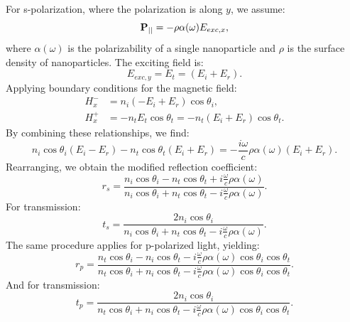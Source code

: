 \documentclass{article}
\begin{document}
	For s-polarization, where the polarization is along $y$, we assume:
	\begin{equation}
		\vb{P}_{||} = -\rho \alpha(\omega) E_{exc, x},
	\end{equation}
	where $\alpha(\omega)$ is the polarizability of a single nanoparticle and $\rho$ is the surface density of nanoparticles. The exciting field is:
	\begin{equation}
		E_{exc, y} = E_t = (E_i + E_r).
	\end{equation}
	Applying boundary conditions for the magnetic field:
	\begin{align}
		H_{x}^{-} &= n_i (-E_i + E_r) \cos \theta_i, \\
		H_{x}^{+} &= -n_t E_t \cos \theta_t = -n_t (E_i + E_r) \cos \theta_t.
	\end{align}
	By combining these relationships, we find:
	\begin{equation}
		n_i \cos \theta_i (E_i - E_r) - n_t \cos \theta_t (E_i + E_r) = -\frac{i \omega}{c} \rho \alpha(\omega) (E_i + E_r).
	\end{equation}
	Rearranging, we obtain the modified reflection coefficient:
	\begin{equation}
		r_s = \frac{n_i \cos \theta_i - n_t \cos \theta_t + i \frac{\omega}{c} \rho \alpha(\omega)}{n_i \cos \theta_i + n_t \cos \theta_t - i \frac{\omega}{c} \rho \alpha(\omega)}.
	\end{equation}
	For transmission:
	\begin{equation}
		t_s = \frac{2 n_i \cos \theta_i}{n_i \cos \theta_i + n_t \cos \theta_t - i \frac{\omega}{c} \rho \alpha(\omega)}.
	\end{equation}
	The same procedure applies for p-polarized light, yielding:
	\begin{equation}
		r_p = \frac{n_t \cos \theta_i - n_i \cos \theta_t - i \frac{\omega}{c} \rho \alpha(\omega) \cos \theta_i \cos \theta_t}{n_t \cos \theta_i + n_i \cos \theta_t - i \frac{\omega}{c} \rho \alpha(\omega) \cos \theta_i \cos \theta_t}.
	\end{equation}
	And for transmission:
	\begin{equation}
		t_p = \frac{2 n_i \cos \theta_i}{n_t \cos \theta_i + n_i \cos \theta_t - i \frac{\omega}{c} \rho \alpha(\omega) \cos \theta_i \cos \theta_t}.
	\end{equation}
	
\end{document}
